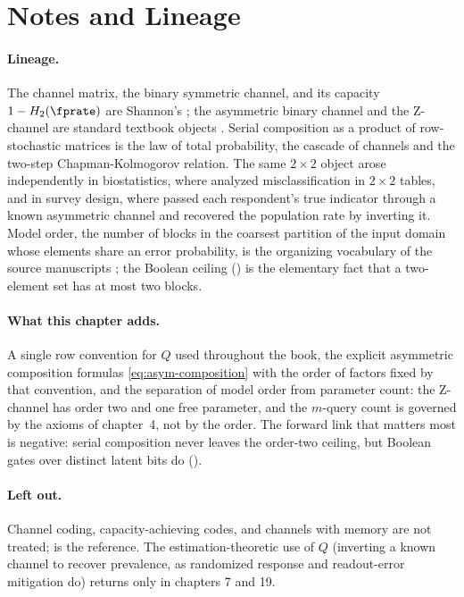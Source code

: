 %

\section{Notes and Lineage}
\label{sec:bib-notes-ch2}

\paragraph{Lineage.}
The channel matrix, the binary symmetric channel, and its capacity $1 -
H_2(\fprate)$ are Shannon's \parencite{shannon-1948}; the asymmetric binary
channel and the Z-channel are standard textbook objects
\parencite[Ch.~7]{cover-thomas}. Serial composition as a product of
row-stochastic matrices is the law of total probability, the cascade of
channels and the two-step Chapman-Kolmogorov relation. The same $2 \times 2$
object arose independently in biostatistics, where \textcite{bross-1954}
analyzed misclassification in $2 \times 2$ tables, and in survey design, where
\textcite{warner-1965} passed each respondent's true indicator through a known
asymmetric channel and recovered the population rate by inverting it. Model
order, the number of blocks in the coarsest partition of the input domain whose
elements share an error probability, is the organizing vocabulary of the
source manuscripts \parencite{towell-bernoulli-sets,towell-bernoulli-data-type};
the Boolean ceiling () is the elementary fact that a
two-element set has at most two blocks.

\paragraph{What this chapter adds.}
A single row convention for $Q$ used throughout the book, the explicit
asymmetric composition formulas \eqref{eq:asym-composition} with the order of
factors fixed by that convention, and the separation of model order from
parameter count: the Z-channel has order two and one free parameter, and the
$m$-query count is governed by the axioms of chapter~4, not by the order. The
forward link that matters most is negative: serial composition never leaves the
order-two ceiling, but Boolean gates over distinct latent bits do
().

\paragraph{Left out.}
Channel coding, capacity-achieving codes, and channels with memory are not
treated; \textcite{cover-thomas} is the reference. The estimation-theoretic use
of $Q$ (inverting a known channel to recover prevalence, as randomized response
and readout-error mitigation do) returns only in chapters 7 and 19.
